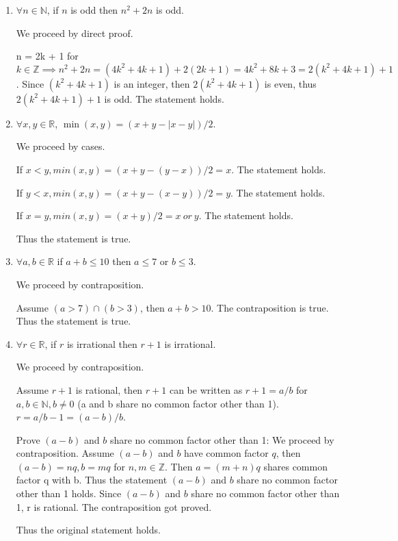\documentclass{article}\usepackage{amsmath,amssymb,amsthm,tikz,tkz-graph,color,chngpage,soul,hyperref,csquotes,graphicx,floatrow, yfonts}\newcommand*{\QEDB}{\hfill\ensuremath{\square}}\newtheorem*{prop}{Proposition}\renewcommand{\theenumi}{\alph{enumi}}\usepackage[shortlabels]{enumitem}\usepackage[nobreak=true, framemethod=tikz]{mdframed}\usetikzlibrary{matrix,calc, automata, positioning}\MakeOuterQuote{"}\usepackage[margin=1in]{geometry} \newtheorem{theorem}{Theorem}
\begin{document}
\begin{enumerate}

  \item $\forall n \in \mathbb{N}$, if $n$ is odd then $n^2 + 2n$ is odd.
  \begin{mdframed}
   We proceed by direct proof. \par
   n = 2k + 1 for $ k \in \mathbb{Z} \implies n^2 + 2n = (4k^2 + 4k + 1) + 2(2k + 1) = 4k^2 + 8k +3 = 2(k^2 + 4k + 1) + 1$. Since $(k^2 + 4k + 1)$ is an integer, then $2(k^2 + 4k + 1)$ is even, thus $2(k^2 + 4k + 1) + 1$ is odd. The statement holds.
  \end{mdframed}

  \item $\forall x, y \in \mathbb{R}$, $\min(x, y) = (x + y - |x - y|)/2$.
  \begin{mdframed}
  We proceed by cases. \par
  If $x < y, min(x, y) = (x + y - (y - x)) / 2 = x$. The statement holds. \par
  If $y < x, min(x, y) = (x + y - (x - y)) / 2 = y$. The statement holds. \par
  If $x = y, min(x, y) = (x + y ) / 2 = x \ or \ y$. The statement holds. \par
  Thus the statement is true.
  \end{mdframed}

  \item $\forall a, b \in \mathbb{R}$ if $a + b \le 10$ then $a \le 7$ or $b \le 3$.
  \begin{mdframed}
  We proceed by contraposition. \par
  Assume $(a > 7) \cap (b > 3)$, then $a + b > 10$. The contraposition is true.
  Thus the statement is true.
  \end{mdframed}

  \item $\forall r \in \mathbb{R}$, if $r$ is irrational then $r + 1$ is irrational.
  \begin{mdframed}
  We proceed by contraposition. \par
  Assume $r + 1$ is rational, then $r + 1$ can be written as $ r + 1 = a / b $ for $ a, b \in \mathbb{N} , b \neq 0$ (a and b share no common factor other than 1).
  $r = a / b - 1 = (a - b) / b$. \par
  Prove $(a - b)$ and $b$ share no common factor other than 1: We proceed by contraposition. Assume $(a - b)$ and $b$ have common factor $q$, then $(a - b) = nq, b = mq$ for $n, m \in \mathbb{Z}$. Then $a = (m + n)q$ shares common factor q with b. Thus the statement $(a - b)$ and $b$ share no common factor other than 1 holds. 
  Since $(a - b)$ and $b$ share no common factor other than 1, r is rational. The contraposition got proved. \par
  Thus the original statement holds.
  \end{mdframed}


\end{enumerate}
\end{document}
